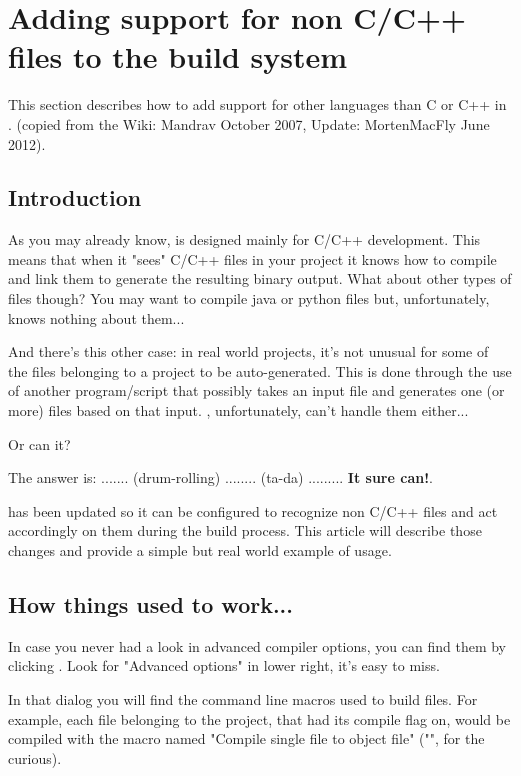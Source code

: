 \section{\codeblocks Adding support for non C/C++ files to the build system}\label{sec:cb_AddLanguage}

This section describes how to add support for other languages than C or C++ in \codeblocks. (copied from the Wiki: Mandrav October 2007, Update: MortenMacFly June 2012).

\subsection{Introduction}
As you may already know, \codeblocks is designed mainly for C/C++ development. This means that when it "sees"  C/C++ files in your project it knows how to compile and link them to generate the resulting binary output. What about other types of files though? You may want to compile java or python files but, unfortunately, \codeblocks knows nothing about them...\

And there's this other case: in real world projects, it's not unusual for some of the files belonging to a project to be auto-generated. This is done through the use of another program/script that possibly takes an input file and generates one (or more) files based on that input. \codeblocks, unfortunately, can't handle them either...\

Or can it?\

The answer is: ....... (drum-rolling) ........ (ta-da) ......... \textbf{It sure can!}.\

\codeblocks has been updated so it can be configured to recognize non C/C++ files and act accordingly on them during the build process. This article will describe those changes and provide a simple but real world example of usage. 

\subsection{How things used to work...}

In case you never had a look in advanced compiler options, you can find them by clicking . Look for "Advanced options" in lower right, it's easy to miss.\

In that dialog you will find the command line macros used to build files. For example, each file belonging to the project, that had its compile flag on, would be compiled with the macro named "Compile single file to object file" ("", for the curious).\


